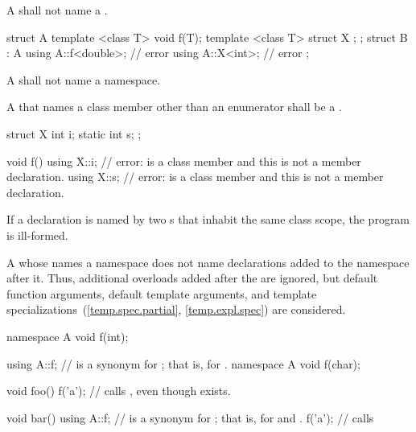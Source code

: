\pnum
A  shall not name a .
\begin{example}
\begin{codeblock}
struct A {
  template <class T> void f(T);
  template <class T> struct X { };
};
struct B : A {
  using A::f<double>;           // error
  using A::X<int>;              // error
};
\end{codeblock}
\end{example}

\pnum
A  shall not name a namespace.

\pnum
A  that names a class member
other than an enumerator
shall be a
.
\begin{example}
\begin{codeblock}
struct X {
  int i;
  static int s;
};

void f() {
  using X::i;                   // error:  is a class member and this is not a member declaration.
  using X::s;                   // error:  is a class member and this is not a member declaration.
}
\end{codeblock}
\end{example}

\pnum
If a declaration is named by two s
that inhabit the same class scope, the program is ill-formed.

\pnum
\begin{note}
A 
whose  names a namespace
does not name declarations added to the namespace after it. Thus, additional
overloads added after the  are ignored, but
default function arguments, default template
arguments, and template specializations~(\ref{temp.spec.partial},
\ref{temp.expl.spec}) are considered.
\end{note}
\begin{example}
\begin{codeblock}
namespace A {
  void f(int);
}

using A::f;         //  is a synonym for ; that is, for .
namespace A {
  void f(char);
}

void foo() {
  f('a');           // calls , even though  exists.
}

void bar() {
  using A::f;       //  is a synonym for ; that is, for  and .
  f('a');           // calls 
}
\end{codeblock}
\end{example}

